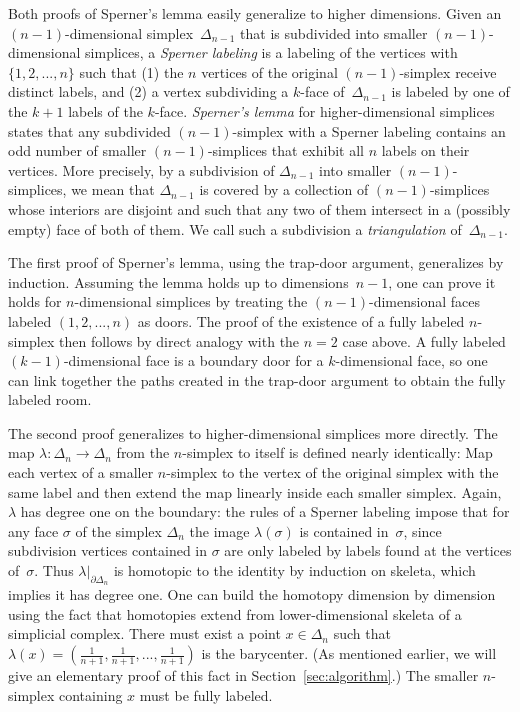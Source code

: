 \documentclass[a4paper,10pt,reqno, english]{amsart}
\theoremstyle{plain}
\theoremstyle{definition}
\begin{document}
Both proofs of Sperner's lemma easily generalize to higher dimensions. Given an $(n-1)$-dimensional simplex~$\Delta_{n-1}$ that is subdivided into smaller $(n-1)$-dimensional simplices, a \emph{Sperner labeling} is a labeling of the vertices with $\{1,2,...,n\}$ such that (1) the $n$ vertices of the original $(n-1)$-simplex receive distinct labels, and (2) a vertex subdividing a $k$-face of~$\Delta_{n-1}$ is labeled by one of the $k+1$ labels of the $k$-face. \emph{Sperner's lemma} for higher-dimensional simplices states that any subdivided $(n-1)$-simplex with a Sperner labeling contains an odd number of smaller $(n-1)$-simplices that exhibit all $n$ labels on their vertices. More precisely, by a subdivision of $\Delta_{n-1}$ into smaller $(n-1)$-simplices, we mean that $\Delta_{n-1}$ is covered by a collection of $(n-1)$-simplices whose interiors are disjoint and such that any two of them intersect in a (possibly empty) face of both of them. We call such a subdivision a \emph{triangulation} of~$\Delta_{n-1}$.

The first proof of Sperner's lemma, using the trap-door argument, generalizes by induction. Assuming the lemma holds up to dimensions~${n-1}$, one can prove it holds for $n$-dimensional simplices by treating the $(n-1)$-dimensional faces labeled $(1,2,...,n)$ as doors. The proof of the existence of a fully labeled $n$-simplex then follows by direct analogy with the $n=2$ case above. A fully labeled $(k-1)$-dimensional face is a boundary door for a $k$-dimensional face, so one can link together the paths created in the trap-door argument to obtain the fully labeled room.

The second proof generalizes to higher-dimensional simplices more directly. The map $\lambda\colon \Delta_n \longrightarrow \Delta_n$ from the $n$-simplex to itself is defined nearly identically: Map each vertex of a smaller $n$-simplex to the vertex of the original simplex with the same label and then extend the map linearly inside each smaller simplex. 
Again, $\lambda$ has degree one on the boundary: the rules of a Sperner labeling impose that for any face $\sigma$ of the simplex $\Delta_n$ the image $\lambda(\sigma)$ is contained in~$\sigma$, since subdivision vertices contained in $\sigma$ are only labeled by labels found at the vertices of~$\sigma$. 
Thus $\lambda|_{\partial\Delta_n}$ is homotopic to the identity by induction on skeleta, which implies it has degree one. One can build the homotopy dimension by dimension using the fact that homotopies extend from lower-dimensional skeleta of a simplicial complex.
There must exist a point $x \in \Delta_n$ such that $\lambda(x) = (\frac{1}{n+1},\frac{1}{n+1},...,\frac{1}{n+1})$ is the barycenter. (As mentioned earlier, we will give an elementary proof of this fact in Section~\ref{sec:algorithm}.) The smaller $n$-simplex containing $x$ must be fully labeled.
\end{document}
